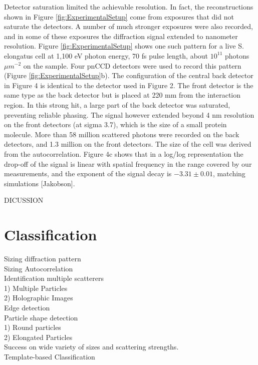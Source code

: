 Detector saturation limited the achievable resolution.  In fact, the reconstructions shown in Figure \ref{fig:ExperimentalSetup} come from exposures that did not saturate the detectors. A number of much stronger exposures were also recorded, and in some of these exposures the diffraction signal extended to nanometer resolution. Figure \ref{fig:ExperimentalSetup} shows one such pattern for a live S. elongatus cell at 1,100 eV photon energy, 70 fs pulse length, about $10^11$ photons $\mu m^{-2}$ on the sample. Four pnCCD detectors were used to record this pattern (Figure \ref{fig:ExperimentalSetup}b). The configuration of the central back detector in Figure 4 is identical to the detector used in Figure 2. The front detector is the same type as the back detector but is placed at 220 mm from the interaction region. In this strong hit, a large part of the back detector was saturated, preventing reliable phasing. The signal however extended beyond 4 nm resolution on the front detectors (at sigma 3.7), which is the size of a small protein molecule. More than 58 million scattered photons were recorded on the back detectors, and 1.3 million on the front detectors. The size of the cell was derived from the autocorrelation. Figure 4c shows that in a log/log representation the drop-off of the signal is linear with spatial frequency in the range covered by our measurements, and the exponent of the signal decay is $-3.31\pm0.01$, matching simulations [Jakobson].

DICUSSION 

\section{Classification}

Sizing diffraction pattern
\\
Sizing Autocorrelation
\\
Identification multiple scatterers
\\	1) Multiple Particles
\\	2) Holographic Images
\\
Edge detection
\\
Particle shape detection
\\	1) Round particles
\\	2) Elongated Particles
\\
Success on wide variety of sizes and scattering strengths.
\\
Template-based Classification
\\

